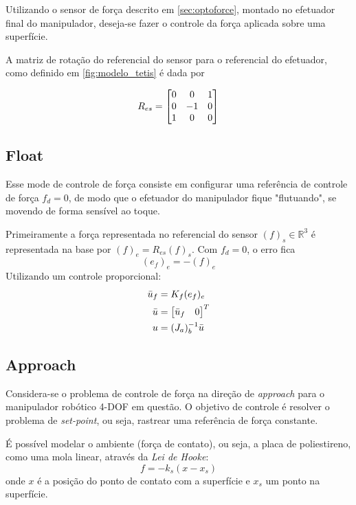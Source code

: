 Utilizando o sensor de força descrito em \ref{sec:optoforce}, montado no efetuador final do manipulador, deseja-se fazer o controle da força aplicada sobre uma superfície. 

A matriz de rotação do referencial do sensor para o referencial do efetuador, como definido em \ref{fig:modelo_tetis} é dada por

\begin{equation}
R_{es} = \begin{bmatrix}
  0 & 0 & 1 \\
  0 & -1 & 0 \\
  1 & 0 & 0
\end{bmatrix}
\end{equation}

\subsection{Float}  \label{sec:forca_float}
Esse mode de controle de força consiste em configurar uma referência de controle de força ${f}_d = 0$, de modo que o efetuador do manipulador fique "flutuando", se movendo de forma sensível ao toque.

Primeiramente a força representada no referencial do sensor $({f})_s \in \mathbb{R}^3 $ é representada na base por $({f})_e = R_{es} ({f})_s$. Com ${f}_d = 0$, o erro fica
\begin{equation}
({e}_f)_e = - ({f})_e 
\end{equation}
Utilizando um controle proporcional:
\begin{align}
\bar{{u}}_f &= {K}_f ({e}_f)_e \\
\bar{{u}} &= \begin{bmatrix} \bar{{u}}_f & 0\end{bmatrix}^T\\
{u} &= ({J_a})_b^{-1} \bar{{u}}
\end{align}

\subsection{Approach} \label{sec:forca_approach}
Considera-se o problema de controle de força na direção de \textit{approach} para o manipulador robótico 4-DOF em questão. O objetivo de controle é resolver o problema de \textit{set-point}, ou seja, rastrear uma referência de força constante.

É possível modelar o ambiente (força de contato), ou seja, a placa de poliestireno, como uma mola linear, através da \textit{Lei de Hooke}: 
\begin{equation}
f = -k_s (x - x_s)
\end{equation}
onde $x$ é a posição do ponto de contato com a superfície e $x_s$ um ponto na superfície.

